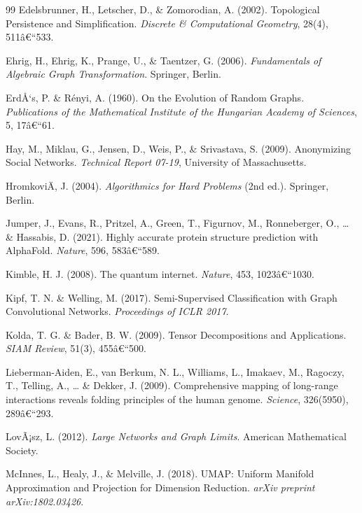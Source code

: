 ﻿\documentclass[12pt,a4paper,twoside]{article}
\theoremstyle{definition}
\theoremstyle{plain}
\theoremstyle{remark}
\begin{document}
\begin{thebibliography}{99}
  Edelsbrunner, H., Letscher, D., \& Zomorodian, A. (2002).
  Topological Persistence and Simplification.
  \textit{Discrete \& Computational Geometry}, 28(4), 511â€“533.

  Ehrig, H., Ehrig, K., Prange, U., \& Taentzer, G. (2006).
  \textit{Fundamentals of Algebraic Graph Transformation}.
  Springer, Berlin.

  ErdÅ‘s, P. \& Rényi, A. (1960).
  On the Evolution of Random Graphs.
  \textit{Publications of the Mathematical Institute of the Hungarian
  Academy of Sciences}, 5, 17â€“61.

  Hay, M., Miklau, G., Jensen, D., Weis, P., \& Srivastava, S. (2009).
  Anonymizing Social Networks.
  \textit{Technical Report 07-19}, University of Massachusetts.

  HromkoviÄ, J. (2004).
  \textit{Algorithmics for Hard Problems} (2nd ed.).
  Springer, Berlin.

  Jumper, J., Evans, R., Pritzel, A., Green, T., Figurnov, M.,
  Ronneberger, O., \ldots{} \& Hassabis, D. (2021).
  Highly accurate protein structure prediction with AlphaFold.
  \textit{Nature}, 596, 583â€“589.

  Kimble, H. J. (2008).
  The quantum internet.
  \textit{Nature}, 453, 1023â€“1030.

  Kipf, T. N. \& Welling, M. (2017).
  Semi-Supervised Classification with Graph Convolutional Networks.
  \textit{Proceedings of ICLR 2017}.

  Kolda, T. G. \& Bader, B. W. (2009).
  Tensor Decompositions and Applications.
  \textit{SIAM Review}, 51(3), 455â€“500.

  Lieberman-Aiden, E., van Berkum, N. L., Williams, L., Imakaev, M.,
  Ragoczy, T., Telling, A., \ldots{} \& Dekker, J. (2009).
  Comprehensive mapping of long-range interactions reveals folding
  principles of the human genome.
  \textit{Science}, 326(5950), 289â€“293.

  LovÃ¡sz, L. (2012).
  \textit{Large Networks and Graph Limits}.
  American Mathematical Society.

  McInnes, L., Healy, J., \& Melville, J. (2018).
  UMAP: Uniform Manifold Approximation and Projection for Dimension
  Reduction.
  \textit{arXiv preprint arXiv:1802.03426}.


\end{thebibliography}
\end{document}
